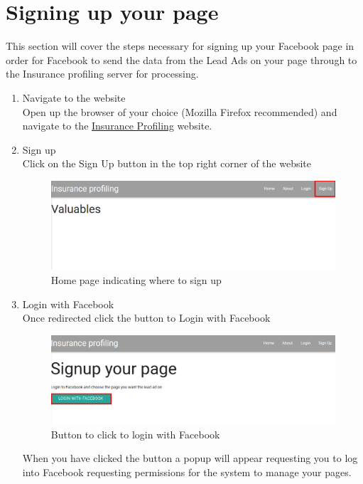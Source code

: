 \documentclass{article}
\begin{document}
	\section{Signing up your page}
		This section will cover the steps necessary for signing up your Facebook page in order for Facebook to send the data from the Lead Ads on your page through to the Insurance profiling server for processing.
		\begin{enumerate}
			\item Navigate to the website\\
			Open up the browser of your choice (Mozilla Firefox recommended) and navigate to the \href{https://insuranceprofiling.herokuapp.com}{Insurance Profiling} website.

			\item Sign up\\
			Click on the Sign Up button in the top right corner of the website\\
			\begin{figure}[H]
			  \centering
			      \includegraphics[width=\textwidth]{images/home_signup.png}
			  \caption{Home page indicating where to sign up}
			  \label{fig:homeSignup}
			\end{figure}

			\item Login with Facebook\\
			Once redirected click the button to Login with Facebook\\
			\begin{figure}[H]
			  \centering
			      \includegraphics[width=\textwidth]{images/signup_login.png}
			  \caption{Button to click to login with Facebook}
			  \label{fig:signupLogin}
			\end{figure}
			When you have clicked the button a popup will appear requesting you to log into Facebook requesting permissions for the system to manage your pages.


\end{enumerate}
\end{document}
